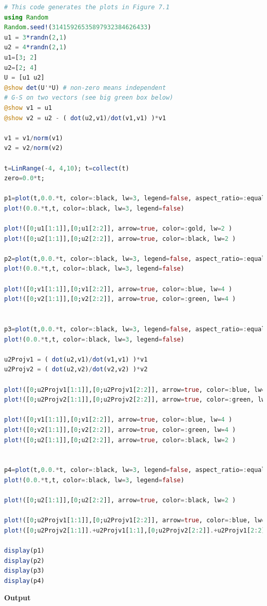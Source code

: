 \begin{lstlisting}[language=Julia,style=mystyle]
# This code generates the plots in Figure 7.1
using Random
Random.seed!(31415926535897932384626433)
u1 = 3*randn(2,1)
u2 = 4*randn(2,1)
u1=[3; 2]
u2=[2; 4]
U = [u1 u2]
@show det(U'*U) # non-zero means independent
# G-S on two vectors (see big green box below)
@show v1 = u1
@show v2 = u2 - ( dot(u2,v1)/dot(v1,v1) )*v1

v1 = v1/norm(v1)
v2 = v2/norm(v2)

t=LinRange(-4, 4,10); t=collect(t)
zero=0.0*t;

p1=plot(t,0.0.*t, color=:black, lw=3, legend=false, aspect_ratio=:equal,framestyle = :origin)
plot!(0.0.*t,t, color=:black, lw=3, legend=false)

plot!([0;u1[1:1]],[0;u1[2:2]], arrow=true, color=:gold, lw=2 )
plot!([0;u2[1:1]],[0;u2[2:2]], arrow=true, color=:black, lw=2 )

p2=plot(t,0.0.*t, color=:black, lw=3, legend=false, aspect_ratio=:equal,framestyle = :origin)
plot!(0.0.*t,t, color=:black, lw=3, legend=false)

plot!([0;v1[1:1]],[0;v1[2:2]], arrow=true, color=:blue, lw=4 )
plot!([0;v2[1:1]],[0;v2[2:2]], arrow=true, color=:green, lw=4 )


p3=plot(t,0.0.*t, color=:black, lw=3, legend=false, aspect_ratio=:equal,framestyle = :origin)
plot!(0.0.*t,t, color=:black, lw=3, legend=false)

u2Projv1 = ( dot(u2,v1)/dot(v1,v1) )*v1
u2Projv2 = ( dot(u2,v2)/dot(v2,v2) )*v2

plot!([0;u2Projv1[1:1]],[0;u2Projv1[2:2]], arrow=true, color=:blue, lw=2 )
plot!([0;u2Projv2[1:1]],[0;u2Projv2[2:2]], arrow=true, color=:green, lw=2 )

plot!([0;v1[1:1]],[0;v1[2:2]], arrow=true, color=:blue, lw=4 )
plot!([0;v2[1:1]],[0;v2[2:2]], arrow=true, color=:green, lw=4 )
plot!([0;u2[1:1]],[0;u2[2:2]], arrow=true, color=:black, lw=2 )


p4=plot(t,0.0.*t, color=:black, lw=3, legend=false, aspect_ratio=:equal,framestyle = :origin)
plot!(0.0.*t,t, color=:black, lw=3, legend=false)

plot!([0;u2[1:1]],[0;u2[2:2]], arrow=true, color=:black, lw=2 )

plot!([0;u2Projv1[1:1]],[0;u2Projv1[2:2]], arrow=true, color=:blue, lw=2 )
plot!([0;u2Projv2[1:1]].+u2Projv1[1:1],[0;u2Projv2[2:2]].+u2Projv1[2:2], arrow=true, color=:green, lw=2 )

display(p1)
display(p2)
display(p3)
display(p4)
\end{lstlisting}
\textbf{Output} 

